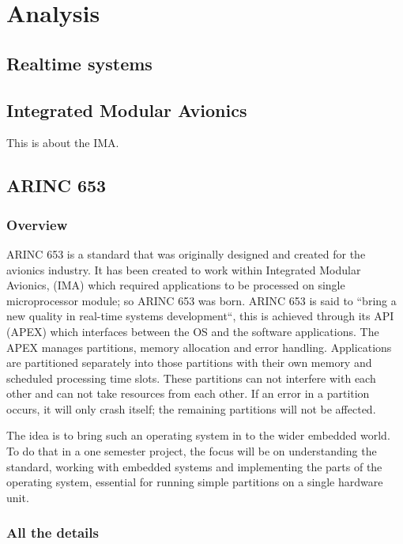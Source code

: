 \chapter{Analysis}

\section{Realtime systems}

\section{Integrated Modular Avionics}
This is about the IMA.

\section{ARINC 653}
\subsection{Overview}
ARINC 653 is a standard that was originally designed and created for the avionics industry.
It has been created to work within Integrated Modular Avionics,
(IMA) which required applications to be processed on single microprocessor module; so ARINC 653 was born.
ARINC 653 is said to “bring a new quality in real-time systems development“,
this is achieved through its API (APEX) which interfaces between the OS and the software applications.
The APEX manages partitions, memory allocation and error handling.
Applications are partitioned separately into those partitions with their own memory and scheduled processing time slots.
These partitions can not interfere with each other and can not take resources from each other.
If an error in a partition occurs, it will only crash itself; the remaining partitions will not be affected.

The idea is to bring such an operating system in to the wider embedded world.
To do that in a one semester project, the focus will be on understanding the standard,
working with embedded systems and implementing the parts of the operating system,
essential for running simple partitions on a single hardware unit.

\subsection{All the details}


